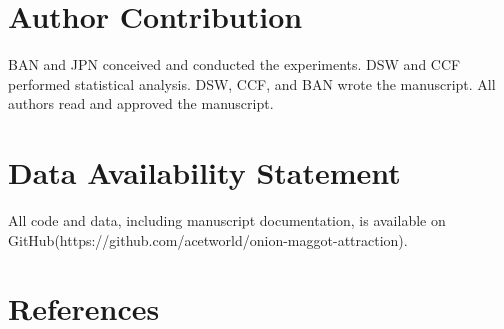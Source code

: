 \documentclass[alpha-refs]{wiley-article}
\begin{document}
\section*{Author Contribution}
BAN and JPN conceived and conducted the experiments. DSW and CCF performed statistical analysis.  DSW, CCF, and BAN wrote the manuscript.  All authors read and approved the manuscript.    


\section*{Data Availability Statement}
All code and data, including manuscript documentation, is available on GitHub(https://github.com/acetworld/onion-maggot-attraction).



\section{References}




\end{document}
